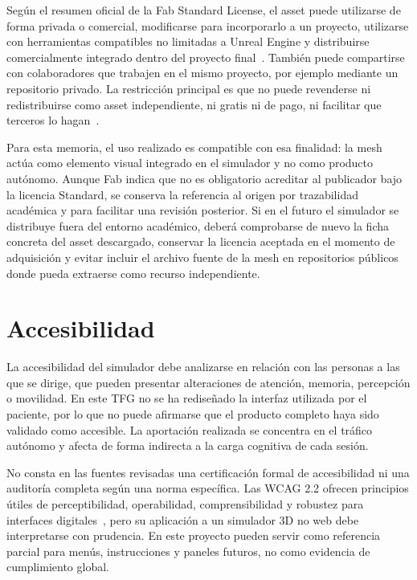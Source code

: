 Según el resumen oficial de la Fab Standard License, el asset puede utilizarse de forma privada o comercial, modificarse para incorporarlo a un proyecto, utilizarse con herramientas compatibles no limitadas a Unreal Engine y distribuirse comercialmente integrado dentro del proyecto final~\cite{fabstandard}. También puede compartirse con colaboradores que trabajen en el mismo proyecto, por ejemplo mediante un repositorio privado. La restricción principal es que no puede revenderse ni redistribuirse como asset independiente, ni gratis ni de pago, ni facilitar que terceros lo hagan~\cite{fabstandard}.

Para esta memoria, el uso realizado es compatible con esa finalidad: la mesh actúa como elemento visual integrado en el simulador y no como producto autónomo. Aunque Fab indica que no es obligatorio acreditar al publicador bajo la licencia Standard, se conserva la referencia al origen por trazabilidad académica y para facilitar una revisión posterior. Si en el futuro el simulador se distribuye fuera del entorno académico, deberá comprobarse de nuevo la ficha concreta del asset descargado, conservar la licencia aceptada en el momento de adquisición y evitar incluir el archivo fuente de la mesh en repositorios públicos donde pueda extraerse como recurso independiente.

\clearpage
\section{Accesibilidad}

La accesibilidad del simulador debe analizarse en relación con las personas a las que se dirige, que pueden presentar alteraciones de atención, memoria, percepción o movilidad. En este TFG no se ha rediseñado la interfaz utilizada por el paciente, por lo que no puede afirmarse que el producto completo haya sido validado como accesible. La aportación realizada se concentra en el tráfico autónomo y afecta de forma indirecta a la carga cognitiva de cada sesión.

No consta en las fuentes revisadas una certificación formal de accesibilidad ni una auditoría completa según una norma específica. Las WCAG 2.2 ofrecen principios útiles de perceptibilidad, operabilidad, comprensibilidad y robustez para interfaces digitales~\cite{wcag22}, pero su aplicación a un simulador 3D no web debe interpretarse con prudencia. En este proyecto pueden servir como referencia parcial para menús, instrucciones y paneles futuros, no como evidencia de cumplimiento global.

